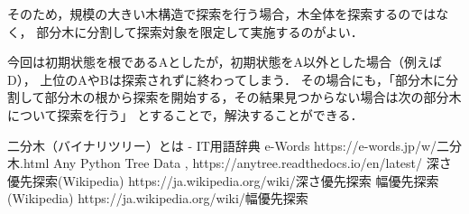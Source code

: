 \documentclass[12pt,dvipdfmx]{jarticle}
\begin{document}
そのため，規模の大きい木構造で探索を行う場合，木全体を探索するのではなく，
部分木に分割して探索対象を限定して実施するのがよい．

今回は初期状態を根であるAとしたが，初期状態をA以外とした場合（例えばD），
上位のAやBは探索されずに終わってしまう．
その場合にも，「部分木に分割して部分木の根から探索を開始する，その結果見つからない場合は次の部分木について探索を行う」
とすることで，解決することができる．



\begin{thebibliography}{1}

二分木（バイナリツリー）とは - IT用語辞典 e-Words
\newblock https://e-words.jp/w/二分木.html
 Any Python Tree Data , https://anytree.readthedocs.io/en/latest/
深さ優先探索(Wikipedia)
	\newblock https://ja.wikipedia.org/wiki/深さ優先探索
幅優先探索(Wikipedia)
	\newblock https://ja.wikipedia.org/wiki/幅優先探索

\end{thebibliography}
\end{document}
